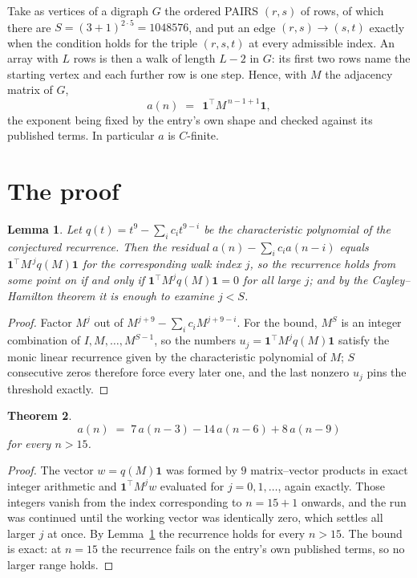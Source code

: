 \documentclass[11pt,a4paper]{article}
\theoremstyle{plain}
\newtheorem{theorem}{Theorem}
\newtheorem{lemma}[theorem]{Lemma}
\theoremstyle{definition}
\begin{document}
Take as vertices of a digraph $G$ the ordered PAIRS $(r,s)$ of rows, of which there are
$S=(3+1)^{2\cdot5}=1048576$, and put an edge $(r,s)\to(s,t)$ exactly when the condition
holds for the triple $(r,s,t)$ at every admissible index. An array with $L$ rows is then a
walk of length $L-2$ in $G$: its first two rows name the starting vertex and each further
row is one step. Hence, with $M$ the adjacency matrix of $G$,
\[
a(n)\;=\;\,\mathbf{1}^{\!\top}M^{\,n-1+1}\mathbf{1},
\]
the exponent being fixed by the entry's own shape and checked against its published terms.
In particular $a$ is $C$-finite.

\section{The proof}

\begin{lemma}\label{lem:crit}
Let $q(t)=t^{9}-\sum_i c_it^{9-i}$ be the characteristic polynomial of the
conjectured recurrence. Then the residual $a(n)-\sum_ic_ia(n-i)$ equals
$\mathbf{1}^{\!\top}M^{\,j}q(M)\mathbf{1}$ for the corresponding walk index
$j$, so the recurrence holds from some point on if and only if
$\mathbf{1}^{\!\top}M^{j}q(M)\mathbf{1}=0$ for all large $j$; and by the
Cayley--Hamilton theorem it is enough to examine $j<S$.
\end{lemma}

\begin{proof}
Factor $M^{j}$ out of $M^{j+9}-\sum_ic_iM^{j+9-i}$. For the bound, $M^{S}$
is an integer combination of $I,M,\dots,M^{S-1}$, so the numbers
$u_j=\mathbf{1}^{\!\top}M^{j}q(M)\mathbf{1}$ satisfy the monic linear recurrence given by
the characteristic polynomial of $M$; $S$ consecutive zeros therefore force every later one,
and the last nonzero $u_j$ pins the threshold exactly.
\end{proof}

\begin{theorem}
\[
a(n)\;=\;7\,a(n-3) - 14\,a(n-6) + 8\,a(n-9)
\]
for every $n>15$.
\end{theorem}

\begin{proof}
The vector $w=q(M)\mathbf{1}$ was formed by $9$ matrix--vector products in exact
integer arithmetic and $\mathbf{1}^{\!\top}M^{j}w$ evaluated for $j=0,1,\dots$, again
exactly. Those integers vanish from the index corresponding to $n=15+1$ onwards, and the
run was continued until the working vector was identically zero, which settles all larger $j$
at once. By Lemma~\ref{lem:crit} the recurrence holds for every $n>15$. The bound is exact: at $n=15$ the recurrence fails on the entry's own published terms, so no larger range holds.
\end{proof}
\end{document}
